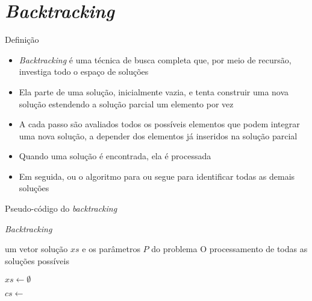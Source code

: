 \section{\it Backtracking}

\begin{frame}[fragile]{Definição}

    \begin{itemize}
        \item \textit{Backtracking} é uma técnica de busca completa que, por meio de recursão,
            investiga todo o espaço de soluções

        \item Ela parte de uma solução, inicialmente vazia, e tenta construir uma nova solução
            estendendo a solução parcial um elemento por vez

        \item A cada passo são avaliados todos os possíveis elementos que podem integrar
            uma nova solução, a depender dos elementos já inseridos na solução parcial

        \item Quando uma solução é encontrada, ela é processada

        \item Em seguida, ou o algoritmo para ou segue para identificar todas as demais soluções

    \end{itemize}

\end{frame}

\begin{frame}[fragile]{Pseudo-código do {\it backtracking}}

    \begin{algorithm}[H]
        \small

        \caption{\it Backtracking}

        \begin{algorithmic}[1]
            \Require um vetor solução $xs$ e os parâmetros $P$ do problema
            \Ensure O processamento de todas as soluções possíveis

            \State $xs \gets \emptyset$
            \State 
 
                    \State {}
                \Else
                    \State $cs \gets $ 

                        \State {}
                        \State {}
                        \State {}
                        \State {}
                        \State {}
                    \EndFor
                \EndIf
            \EndFunction
        \end{algorithmic}
    \end{algorithm}

\end{frame}

